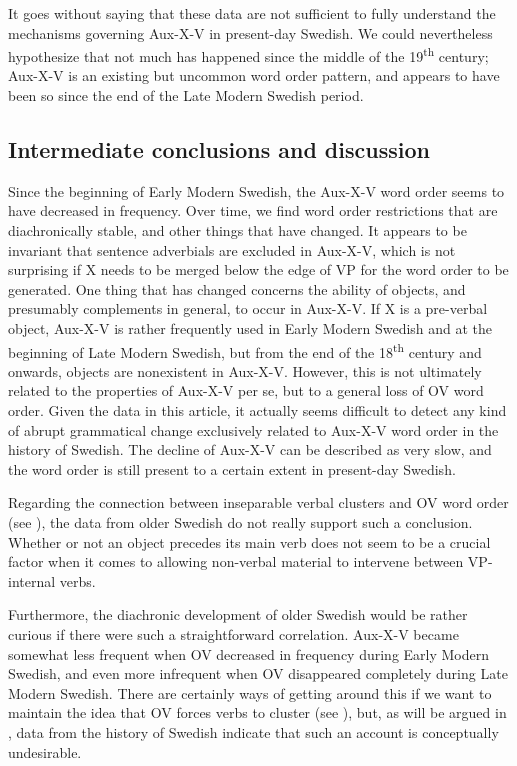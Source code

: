 \documentclass[output=paper, colorlinks, citecolor=brown]{langscibook}
\begin{document}
It goes without saying that these data are not sufficient to fully understand the mechanisms governing Aux-X-V in present-day Swedish. We could nevertheless hypothesize that not much has happened since the middle of the 19\textsuperscript{th} century; Aux-X-V is an existing but uncommon word order pattern, and appears to have been so since the end of the Late Modern Swedish period.

\subsection{Intermediate conclusions and discussion}\label{sec:sangfelt:4.4}
Since the beginning of Early Modern Swedish, the Aux-X-V word order seems to have decreased in frequency. Over time, we find word order restrictions that are diachronically stable, and other things that have changed. It appears to be invariant that sentence adverbials are excluded in Aux-X-V, which is not surprising if X needs to be merged below the edge of VP for the word order to be generated. One thing that has changed concerns the ability of objects, and presumably complements in general, to occur in Aux-X-V. If X is a pre-verbal object, Aux-X-V is rather frequently used in Early Modern Swedish and at the beginning of Late Modern Swedish, but from the end of the 18\textsuperscript{th} century and onwards, objects are nonexistent in Aux-X-V. However, this is not ultimately related to the properties of Aux-X-V per se, but to a general loss of OV word order. Given the data in this article, it actually seems difficult to detect any kind of abrupt grammatical change exclusively related to Aux-X-V word order in the history of Swedish. The decline of Aux-X-V can be described as very slow, and the word order is still present to a certain extent in present-day Swedish.


Regarding the connection between inseparable verbal clusters and OV word order (see \citealt[17–19, 33–35]{Haider2010}), the data from older Swedish do not really support such a conclusion. Whether or not an object precedes its main verb does not seem to be a crucial factor when it comes to allowing non-verbal material to intervene between VP-internal verbs.



Furthermore, the diachronic development of older Swedish would be rather curious if there were such a straightforward correlation. Aux-X-V became somewhat less frequent when OV decreased in frequency during Early Modern Swedish, and even more infrequent when OV disappeared completely during Late Modern Swedish. There are certainly ways of getting around this if we want to maintain the idea that OV forces verbs to cluster (see \cites[290–292]{Haider2010}[132–135]{Haider2013}), but, as will be argued in , data from the history of Swedish indicate that such an account is conceptually undesirable.
\end{document}

